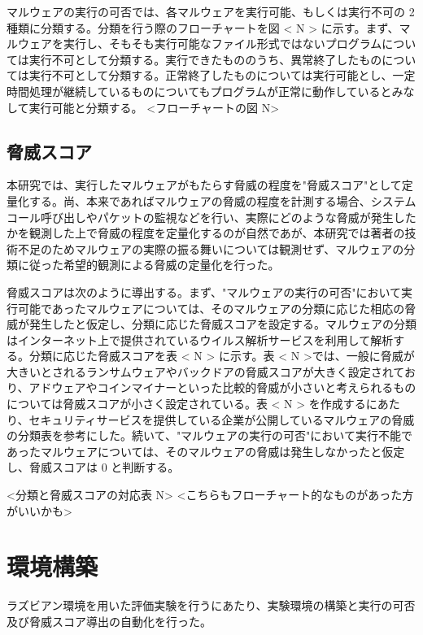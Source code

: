 \documentclass[12pt,a4paper,titlepage,report]{jsbook}
\begin{document}
マルウェアの実行の可否では、各マルウェアを実行可能、もしくは実行不可の 2 種類に分類する。分類を行う際のフローチャートを図 < N > に示す。まず、マルウェアを実行し、そもそも実行可能なファイル形式ではないプログラムについては実行不可として分類する。実行できたもののうち、異常終了したものについては実行不可として分類する。正常終了したものについては実行可能とし、一定時間処理が継続しているものについてもプログラムが正常に動作しているとみなして実行可能と分類する。
<フローチャートの図 N>

\subsection{脅威スコア}
本研究では、実行したマルウェアがもたらす脅威の程度を"脅威スコア"として定量化する。尚、本来であればマルウェアの脅威の程度を計測する場合、システムコール呼び出しやパケットの監視などを行い、実際にどのような脅威が発生したかを観測した上で脅威の程度を定量化するのが自然であが、本研究では著者の技術不足のためマルウェアの実際の振る舞いについては観測せず、マルウェアの分類に従った希望的観測による脅威の定量化を行った。

脅威スコアは次のように導出する。まず、"マルウェアの実行の可否"において実行可能であったマルウェアについては、そのマルウェアの分類に応じた相応の脅威が発生したと仮定し、分類に応じた脅威スコアを設定する。マルウェアの分類はインターネット上で提供されているウイルス解析サービスを利用して解析する。分類に応じた脅威スコアを表 < N > に示す。表 < N >では、一般に脅威が大きいとされるランサムウェアやバックドアの脅威スコアが大きく設定されており、アドウェアやコインマイナーといった比較的脅威が小さいと考えられるものについては脅威スコアが小さく設定されている。表 < N > を作成するにあたり、セキュリティサービスを提供している企業が公開しているマルウェアの脅威の分類表を参考にした\*。続いて、"マルウェアの実行の可否"において実行不能であったマルウェアについては、そのマルウェアの脅威は発生しなかったと仮定し、脅威スコアは 0 と判断する。

<分類と脅威スコアの対応表 N>
<こちらもフローチャート的なものがあった方がいいかも>

\section{環境構築}
ラズビアン環境を用いた評価実験を行うにあたり、実験環境の構築と実行の可否及び脅威スコア導出の自動化を行った。
\end{document}
